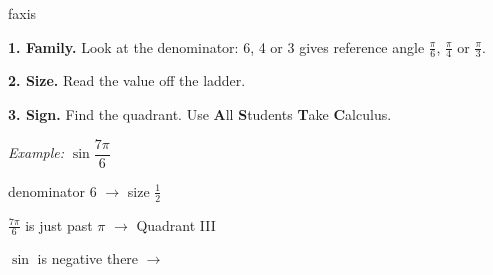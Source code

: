 \documentclass[11pt]{article}
\begin{document}
\vspace{6pt}
\begin{tip}[title={Any angle in three steps}]{faxis}
\begin{minipage}[t]{0.56\linewidth}
\small
\textbf{1. Family.} Look at the denominator: 6, 4 or 3 gives reference angle
$\frac{\pi}{6}$, $\frac{\pi}{4}$ or $\frac{\pi}{3}$.\par
\textbf{2. Size.} Read the value off the ladder.\par
\textbf{3. Sign.} Find the quadrant. Use \textbf{A}ll \textbf{S}tudents
\textbf{T}ake \textbf{C}alculus.
\end{minipage}\hfill
\begin{minipage}[t]{0.41\linewidth}
\small\emph{Example:} $\sin\dfrac{7\pi}{6}$\par\smallskip
denominator 6 $\to$ size $\tfrac12$\par
$\frac{7\pi}{6}$ is just past $\pi$ $\to$ Quadrant III\par
$\sin$ is negative there $\to$ 
\end{minipage}
\end{tip}
\end{document}

